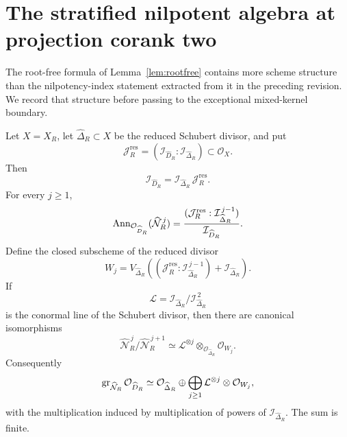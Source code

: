 \section{The stratified nilpotent algebra at projection corank two}
\label{sec:stratified-nilpotent}

The root-free formula of Lemma~\ref{lem:rootfree} contains more
scheme structure than the nilpotency-index statement extracted from it
in the preceding revision.  We record that structure before passing
to the exceptional mixed-kernel boundary.

\begin{theorem}
\label{thm:global-residual-colon}
Let \(X=X_R\), let \(\widehat\Delta_R\subset X\) be the reduced
Schubert divisor, and put
\[
 \mathcal J_R^{\mathrm{res}}
 =
 (\mathcal I_{\widehat D_R}:\mathcal I_{\widehat\Delta_R})
 \subset\mathcal O_X.
\]
Then
\begin{equation}\label{eq:global-residual-factorization}
 \mathcal I_{\widehat D_R}
 =
 \mathcal I_{\widehat\Delta_R}\,
 \mathcal J_R^{\mathrm{res}}.
\end{equation}
For every \(j\ge1\),
\begin{equation}\label{eq:global-ann-colon}
 \operatorname{Ann}_{\mathcal O_{\widehat D_R}}
      (\widehat{\mathcal N}_R^{\,j})
 =
 \frac{
   (\mathcal J_R^{\mathrm{res}}:
    \mathcal I_{\widehat\Delta_R}^{\,j-1})
 }{\mathcal I_{\widehat D_R}}.
\end{equation}
Define the closed subscheme of the reduced divisor
\begin{equation}\label{eq:Wj-definition}
 W_j=
 V_{\widehat\Delta_R}\!\left(
  (\mathcal J_R^{\mathrm{res}}:
   \mathcal I_{\widehat\Delta_R}^{\,j-1})
  +\mathcal I_{\widehat\Delta_R}\right).
\end{equation}
If
\[
 \mathcal L=
 \mathcal I_{\widehat\Delta_R}/
 \mathcal I_{\widehat\Delta_R}^{\,2}
\]
is the conormal line of the Schubert divisor, then there are canonical
isomorphisms
\begin{equation}\label{eq:global-graded-piece}
 \widehat{\mathcal N}_R^{\,j}/
 \widehat{\mathcal N}_R^{\,j+1}
 \simeq
 \mathcal L^{\otimes j}\otimes_{\mathcal O_{\widehat\Delta_R}}
 \mathcal O_{W_j}.
\end{equation}
Consequently
\begin{equation}\label{eq:global-gr-colon}
 \operatorname{gr}_{\widehat{\mathcal N}_R}\mathcal O_{\widehat D_R}
 \simeq
 \mathcal O_{\widehat\Delta_R}
 \oplus
 \bigoplus_{j\ge1}
 \mathcal L^{\otimes j}\otimes\mathcal O_{W_j},
\end{equation}
with the multiplication induced by multiplication of powers of
\(\mathcal I_{\widehat\Delta_R}\).  The sum is finite.


\end{theorem}
